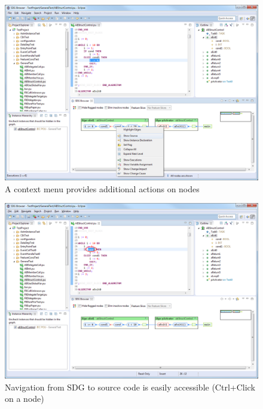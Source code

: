 \begin{figure}[hp]
  \centering
    \includegraphics[width=\textwidth]{bilder/manual-node_context}
  \caption{A context menu provides additional actions on nodes}
  \label{fig:manual-node_context}
\end{figure}

\begin{figure}[hp]
  \centering
    \includegraphics[width=\textwidth]{bilder/manual-show_source}
  \caption{Navigation from SDG to source code is easily accessible (Ctrl+Click on a node)}
  \label{fig:manual-show_source}
\end{figure}

